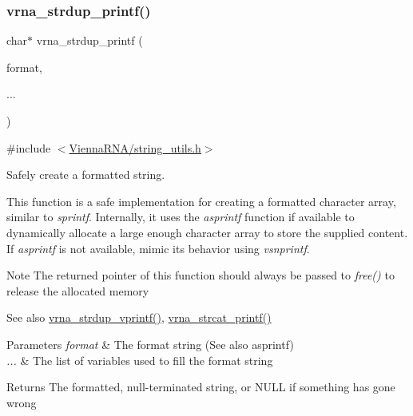 \subsubsection{\texorpdfstring{vrna\+\_\+strdup\+\_\+printf()}{vrna\_strdup\_printf()}}
{\footnotesize\ttfamily char$\ast$ vrna\+\_\+strdup\+\_\+printf (\begin{DoxyParamCaption}\item[{const char $\ast$}]{format,  }\item[{}]{... }\end{DoxyParamCaption})}



{\ttfamily \#include $<$\mbox{\hyperlink{string__utils_8h}{Vienna\+R\+N\+A/string\+\_\+utils.\+h}}$>$}



Safely create a formatted string. 

This function is a safe implementation for creating a formatted character array, similar to {\itshape sprintf}. Internally, it uses the {\itshape asprintf} function if available to dynamically allocate a large enough character array to store the supplied content. If {\itshape asprintf} is not available, mimic it\textquotesingle{}s behavior using {\itshape vsnprintf}.

\begin{DoxyNote}{Note}
The returned pointer of this function should always be passed to {\itshape free()} to release the allocated memory
\end{DoxyNote}
\begin{DoxySeeAlso}{See also}
\mbox{\hyperlink{group__string__utils_ga459fdee190ed81bb7773cbaf671748a9}{vrna\+\_\+strdup\+\_\+vprintf()}}, \mbox{\hyperlink{group__string__utils_gac0771ec71316023067f2aae61a5aa0fb}{vrna\+\_\+strcat\+\_\+printf()}}
\end{DoxySeeAlso}

\begin{DoxyParams}{Parameters}
{\em format} & The format string (See also asprintf) \\
\hline
{\em ...} & The list of variables used to fill the format string \\
\hline
\end{DoxyParams}
\begin{DoxyReturn}{Returns}
The formatted, null-\/terminated string, or N\+U\+LL if something has gone wrong 
\end{DoxyReturn}
\mbox{\label{group__string__utils_ga459fdee190ed81bb7773cbaf671748a9}} 

